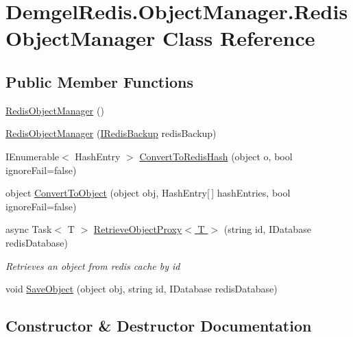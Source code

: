 \hypertarget{class_demgel_redis_1_1_object_manager_1_1_redis_object_manager}{}\section{Demgel\+Redis.\+Object\+Manager.\+Redis\+Object\+Manager Class Reference}
\label{class_demgel_redis_1_1_object_manager_1_1_redis_object_manager}
\subsection*{Public Member Functions}
\begin{DoxyCompactItemize}
\item 
\hyperlink{class_demgel_redis_1_1_object_manager_1_1_redis_object_manager_ae033645a4f3cfccde846e71dc115fb02}{Redis\+Object\+Manager} ()
\item 
\hyperlink{class_demgel_redis_1_1_object_manager_1_1_redis_object_manager_aed91c882241ecfe5022328f1366f71ad}{Redis\+Object\+Manager} (\hyperlink{interface_demgel_redis_1_1_interfaces_1_1_i_redis_backup}{I\+Redis\+Backup} redis\+Backup)
\item 
I\+Enumerable$<$ Hash\+Entry $>$ \hyperlink{class_demgel_redis_1_1_object_manager_1_1_redis_object_manager_a5b1c8c3fe6ff7785de10ca9bdfeb5c65}{Convert\+To\+Redis\+Hash} (object o, bool ignore\+Fail=false)
\item 
object \hyperlink{class_demgel_redis_1_1_object_manager_1_1_redis_object_manager_af73400269f96ab1a8cee3aecbcb1adc6}{Convert\+To\+Object} (object obj, Hash\+Entry\mbox{[}$\,$\mbox{]} hash\+Entries, bool ignore\+Fail=false)
\item 
async Task$<$ T $>$ \hyperlink{class_demgel_redis_1_1_object_manager_1_1_redis_object_manager_a877ed59f8186f98b0ab6629bb541e770}{Retrieve\+Object\+Proxy$<$ T $>$} (string id, I\+Database redis\+Database)
\begin{DoxyCompactList}\small\item\em Retrieves an object from redis cache by id \end{DoxyCompactList}\item 
void \hyperlink{class_demgel_redis_1_1_object_manager_1_1_redis_object_manager_aeac285de3ddcde3dabd0514b767ef72d}{Save\+Object} (object obj, string id, I\+Database redis\+Database)
\end{DoxyCompactItemize}


\subsection{Constructor \& Destructor Documentation}
\hypertarget{class_demgel_redis_1_1_object_manager_1_1_redis_object_manager_ae033645a4f3cfccde846e71dc115fb02}{}
